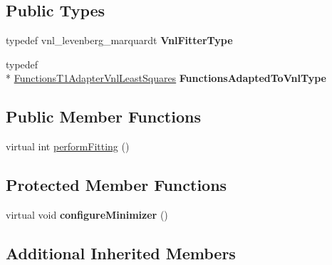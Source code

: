 \subsection*{Public Types}
\begin{DoxyCompactItemize}
\item 
\hypertarget{class_ox_1_1_fitter_levenberg_marquardt_vnl_a29b41024daba2cf8fd6db16a721c3fe5}{typedef vnl\-\_\-levenberg\-\_\-marquardt {\bfseries Vnl\-Fitter\-Type}}\label{class_ox_1_1_fitter_levenberg_marquardt_vnl_a29b41024daba2cf8fd6db16a721c3fe5}

\item 
\hypertarget{class_ox_1_1_fitter_levenberg_marquardt_vnl_a3fd4d3dc03e0c6f165b709c20f3206df}{typedef \\*
\hyperlink{class_ox_1_1_functions_t1_adapter_vnl_least_squares}{Functions\-T1\-Adapter\-Vnl\-Least\-Squares} {\bfseries Functions\-Adapted\-To\-Vnl\-Type}}\label{class_ox_1_1_fitter_levenberg_marquardt_vnl_a3fd4d3dc03e0c6f165b709c20f3206df}

\end{DoxyCompactItemize}
\subsection*{Public Member Functions}
\begin{DoxyCompactItemize}
\item 
virtual int \hyperlink{class_ox_1_1_fitter_levenberg_marquardt_vnl_a533dee878077bfb6f4c9a88db47a15b9}{perform\-Fitting} ()
\end{DoxyCompactItemize}
\subsection*{Protected Member Functions}
\begin{DoxyCompactItemize}
\item 
\hypertarget{class_ox_1_1_fitter_levenberg_marquardt_vnl_a40c77e049c3ba753e6cc3cc3d63a03f5}{virtual void {\bfseries configure\-Minimizer} ()}\label{class_ox_1_1_fitter_levenberg_marquardt_vnl_a40c77e049c3ba753e6cc3cc3d63a03f5}

\end{DoxyCompactItemize}
\subsection*{Additional Inherited Members}


